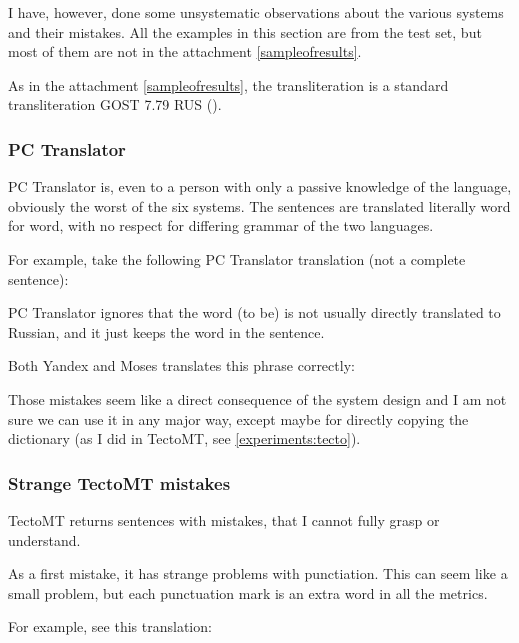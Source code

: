 I have, however, done some unsystematic observations about the various systems and their mistakes. All the examples in this section are from the test set, but most of them are not in the attachment \ref{sampleofresults}.

As in the attachment \ref{sampleofresults}, the transliteration is a standard transliteration GOST 7.79 RUS (\cite{gost}).
\subsubsection{PC Translator}
PC Translator is, even to a person with only a passive knowledge of the language, 
obviously the worst of the six systems. 
The sentences are translated literally word for word, with no respect for differing grammar of the two languages. 

For example, take the following PC Translator translation (not a complete sentence):

PC Translator ignores that the word  (to be) is not usually directly translated to Russian, and it just keeps the word in the sentence. 

Both Yandex and Moses translates this phrase correctly:

Those mistakes seem like a direct consequence of the system design and I am not sure we can use it in any major way, except maybe for directly copying the dictionary (as I did in TectoMT, see \ref{experiments:tecto}). 
\subsubsection{Strange TectoMT mistakes}
TectoMT returns sentences with  mistakes, that I cannot fully grasp or understand. 

As a first mistake, it has strange problems with punctiation. This can seem like a small problem, but each punctuation mark is an extra word in all the metrics.

For example, see this translation:


